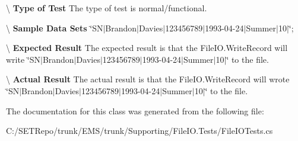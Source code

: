 \textbackslash{} {\bfseries  Type of Test} The type of test is normal/functional.

\textbackslash{} {\bfseries  Sample Data Sets} \char`\"{}\+S\+N$\vert$\+Brandon$\vert$\+Davies$\vert$123456789$\vert$1993-\/04-\/24$\vert$\+Summer$\vert$10$\vert$\char`\"{};

\textbackslash{} {\bfseries  Expected Result} The expected result is that the File\+I\+O.\+Write\+Record will write \char`\"{}\+S\+N$\vert$\+Brandon$\vert$\+Davies$\vert$123456789$\vert$1993-\/04-\/24$\vert$\+Summer$\vert$10$\vert$\char`\"{} to the file.

\textbackslash{} {\bfseries  Actual Result} The actual result is that the File\+I\+O.\+Write\+Record will wrote \char`\"{}\+S\+N$\vert$\+Brandon$\vert$\+Davies$\vert$123456789$\vert$1993-\/04-\/24$\vert$\+Summer$\vert$10$\vert$\char`\"{} to the file. 

The documentation for this class was generated from the following file\+:\begin{DoxyCompactItemize}
\item 
C\+:/\+S\+E\+T\+Repo/trunk/\+E\+M\+S/trunk/\+Supporting/\+File\+I\+O.\+Tests/File\+I\+O\+Tests.\+cs\end{DoxyCompactItemize}
